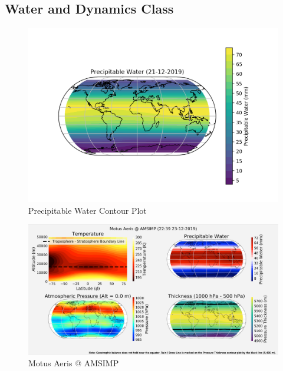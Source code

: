 \begin{appendices}
    \subsection{Water and Dynamics Class}
    \begin{figure}[H]
        \centering
        \includegraphics[width=.8\linewidth]{Graphs/contour_plots/precipitable_water.png}
        \caption{Precipitable Water Contour Plot}
    \end{figure}
    
    \begin{figure}[H]
        \centering
        \includegraphics[width=.8\linewidth]{Graphs/contour_plots/forecast.png}
        \caption{Motus Aeris @ AMSIMP}
    \end{figure}
\end{appendices}